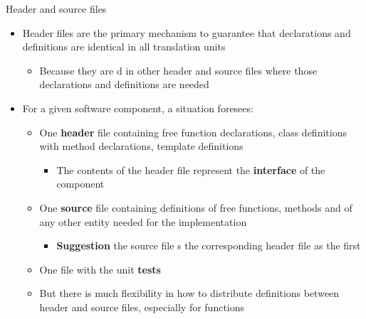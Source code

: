 \begin{frame}{Header and source files}

  \begin{itemize}[<+->]
  \item Header files are the primary mechanism to guarantee that declarations
    and definitions are identical in all translation units
    \begin{itemize}[<.->]
    \item Because they are d in other header and source files
      where those declarations and definitions are needed
    \end{itemize}
  \item For a given software component, a  situation foresees:
    \begin{itemize}
    \item One \textbf{header} file containing free function declarations, class
      definitions with method declarations, template definitions
      \begin{itemize}[<.->]
      \item The contents of the header file represent the \textbf{interface} of
        the component
      \end{itemize}
    \item One \textbf{source} file containing definitions of free functions, methods
      and of any other entity needed for the implementation
      \begin{itemize}[<.->]
      \item \textbf{Suggestion} the source file s the
        corresponding header file as the first 
      \end{itemize}
    \item One file with the unit \textbf{tests}
    \item But there is much flexibility in how to distribute
      definitions between header and source files, especially for
      functions
    \end{itemize}
  \end{itemize}
\end{frame}

